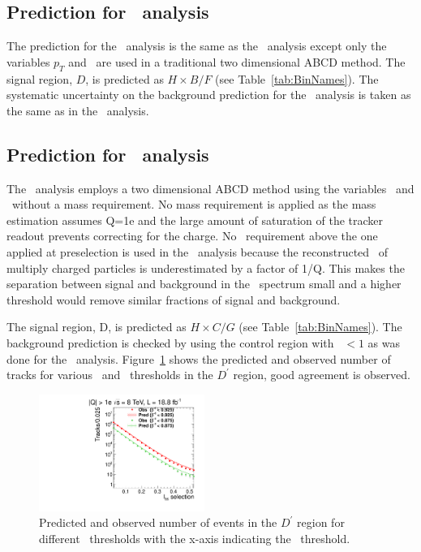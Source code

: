 \subsection{Prediction for \tkonly\ analysis}

The prediction for the \tkonly\ analysis is the same as the \tktof\ analysis except only the variables $p_T$ and \ias\ are used in a traditional two
dimensional ABCD method. 
The signal region, $D$, is predicted as $H \times B / F$ (see Table~\ref{tab:BinNames}).
The systematic uncertainty on the background prediction for the \tkonly\ analysis is taken as the same as in the \tktof\ analysis.

\subsection{Prediction for \multi\ analysis}

The \multi\ analysis employs a two dimensional ABCD method using the variables \invbeta\ and \ias\ without a mass requirement. No mass requirement is applied as the mass
estimation assumes Q=1e and the large amount of saturation of the tracker readout prevents correcting for the charge.
No \pt\ requirement above the one applied at preselection is used in the \multi\ analysis because the reconstructed \pt\ of
multiply charged particles is underestimated by a factor of 1/Q. This makes the separation between signal and background in the \pt\ spectrum small and a
higher threshold would remove similar fractions of signal and background.

The signal region, D, is predicted as $H \times C / G$ (see Table~\ref{tab:BinNames}).
The background prediction is checked by using 
the control region with \invbeta\ $< 1$ as was done for the \muononly\ analysis.
Figure~\ref{fig:MultiPred} shows the predicted and observed number of tracks for various \invbeta\ and \ias\ thresholds in the $D^{\prime}$ region, good agreement is observed.

\begin{figure}
 \begin{center}
  \includegraphics[clip=false, trim=0.0cm 0cm 0.0cm 0cm, width=0.48\textwidth]{figures/multi/Prediction_Data8TeV_NPredVsNObs_Flip}
 \end{center}
 \caption[Predicted and observed number of events in the \invbeta\ $<$ 1 region for different sets of thresholds in the \multi\ analysis.]
{Predicted and observed number of events in the $D^{\prime}$ region for different \invbeta\ thresholds with the x-axis indicating the \ias\ threshold.}
\label{fig:MultiPred}
\end{figure}

